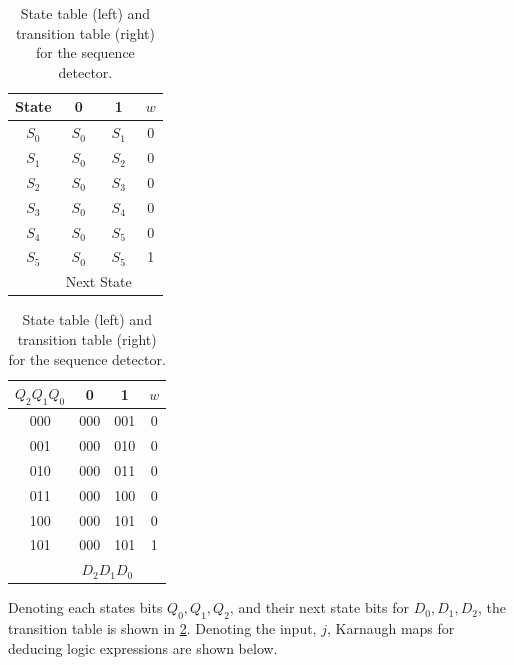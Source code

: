 \documentclass[../main.tex]{subfiles}
\begin{document}
\begin{table}[h]
    \centering
    \begin{minipage}{0.48\textwidth}
        \centering
        \begin{tabular}{|c|c c|c|}
            \hline
            \textbf{State} & 0 & 1 & $w$ \\
            \hline
            $S_0$ & $S_0$ & $S_1$ & 0 \\
            $S_1$ & $S_0$ & $S_2$ & 0 \\
            $S_2$ & $S_0$ & $S_3$ & 0 \\
            $S_3$ & $S_0$ & $S_4$ & 0 \\
            $S_4$ & $S_0$ & $S_5$ & 0 \\
            $S_5$ & $S_0$ & $S_5$ & 1 \\
            \hline
            & \multicolumn{2}{|c|}{Next State} & \\
            \hline
        \end{tabular}
    \end{minipage}%
    \hspace{0.01\textwidth}
    \begin{minipage}{0.48\textwidth}
        \centering
        \begin{tabular}{|c|c c|c|}
            \hline
            $Q_2 Q_1 Q_0$ & 0 & 1 & $w$ \\
            \hline
            000 & 000 & 001 & 0 \\
            001 & 000 & 010 & 0 \\
            010 & 000 & 011 & 0 \\
            011 & 000 & 100 & 0 \\
            100 & 000 & 101 & 0 \\
            101 & 000 & 101 & 1 \\
            \hline
            & \multicolumn{2}{|c|}{$D_2 D_1 D_0$} & \\
            \hline
        \end{tabular}
    \end{minipage}
    \caption{State table (left) and transition table (right) for the sequence detector.}
    \label{tab:q1}
\end{table}

\newpage

Denoting each states bits $Q_0, Q_1, Q_2$, and their next state bits for $D_0, D_1, D_2$, the transition table is shown in \cref{tab:q1}. Denoting the input, $j$, Karnaugh maps for deducing logic expressions are shown below.
\end{document}
